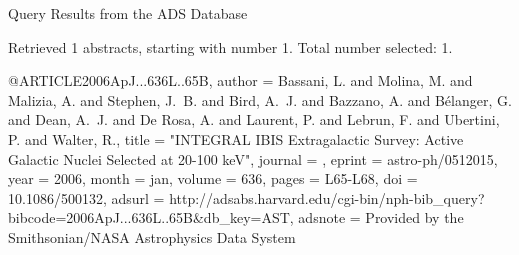 Query Results from the ADS Database


Retrieved 1 abstracts, starting with number 1.  Total number selected: 1.

@ARTICLE{2006ApJ...636L..65B,
   author = {{Bassani}, L. and {Molina}, M. and {Malizia}, A. and {Stephen}, J.~B. and 
	{Bird}, A.~J. and {Bazzano}, A. and {B{\'e}langer}, G. and {Dean}, A.~J. and 
	{De Rosa}, A. and {Laurent}, P. and {Lebrun}, F. and {Ubertini}, P. and 
	{Walter}, R.},
    title = "{INTEGRAL IBIS Extragalactic Survey: Active Galactic Nuclei Selected at 20-100 keV}",
  journal = {\apjl},
   eprint = {astro-ph/0512015},
     year = 2006,
    month = jan,
   volume = 636,
    pages = {L65-L68},
      doi = {10.1086/500132},
   adsurl = {http://adsabs.harvard.edu/cgi-bin/nph-bib_query?bibcode=2006ApJ...636L..65B&db_key=AST},
  adsnote = {Provided by the Smithsonian/NASA Astrophysics Data System}
}


